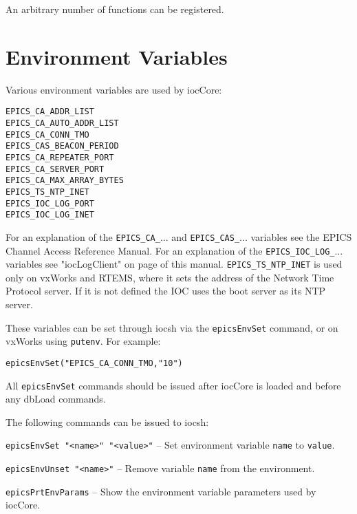 An arbitrary number of functions can be registered.

\section{Environment Variables}

Various environment variables are used by iocCore:

\begin{verbatim}
EPICS_CA_ADDR_LIST
EPICS_CA_AUTO_ADDR_LIST
EPICS_CA_CONN_TMO
EPICS_CAS_BEACON_PERIOD
EPICS_CA_REPEATER_PORT
EPICS_CA_SERVER_PORT
EPICS_CA_MAX_ARRAY_BYTES
EPICS_TS_NTP_INET
EPICS_IOC_LOG_PORT
EPICS_IOC_LOG_INET
\end{verbatim}

For an explanation of the \verb|EPICS_CA_|... and \verb|EPICS_CAS_|... variables see the EPICS Channel Access Reference Manual.
For an explanation of the \verb|EPICS_IOC_LOG_|... variables see "iocLogClient" on page \pageref{iocLogClient} of this manual.
\verb|EPICS_TS_NTP_INET| is used only on vxWorks and RTEMS, where it sets the address of the Network Time Protocol server.
If it is not defined the IOC uses the boot server as its NTP server.

These variables can be set through iocsh via the \verb|epicsEnvSet| command, or on vxWorks using \verb|putenv|.
For example:

\begin{verbatim}
epicsEnvSet("EPICS_CA_CONN_TMO,"10")
\end{verbatim}

All \verb|epicsEnvSet| commands should be issued after iocCore is loaded and before any dbLoad commands.

The following commands can be issued to iocsh:

\verb|epicsEnvSet "<name>" "<value>"| -- Set environment variable \verb|name| to \verb|value|.

\verb|epicsEnvUnset "<name>"| -- Remove variable \verb|name| from the environment.

\verb|epicsPrtEnvParams| -- Show the environment variable parameters used by iocCore.

